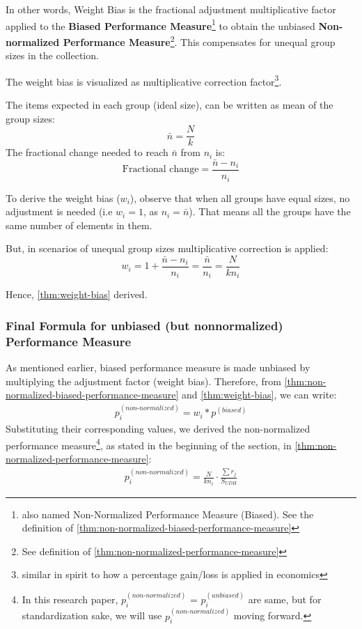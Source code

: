 \documentclass[a4paper,fleqn,review]{cas-sc}
\begin{document}
In other words, Weight Bias is the fractional adjustment multiplicative factor applied to the \textbf{Biased Performance Measure}\footnote{also named Non-Normalized Performance Measure (Biased). See the definition of \autoref{thm:non-normalized-biased-performance-measure}} to obtain the unbiased \textbf{Non-normalized Performance Measure}\footnote{See definition of \autoref{thm:non-normalized-performance-measure}}. This compensates for unequal group sizes in the collection.

\begin{pot}[\ref{thm:weight-bias}]
	 The weight bias is visualized as multiplicative correction factor\footnote{similar in spirit to how a percentage gain/loss is applied in economics}.
\end{pot}

The items expected in each group (ideal size), can be written as mean of the group sizes:
\[
\bar{n} = \frac{N}{k}
\]
The fractional change needed to reach \(\bar{n}\) from \(n_i\) is:
\[
\text{Fractional change} = \frac{\bar{n} - n_i}{n_i}
\]

To derive the weight bias ($w_i$), observe that when all groups have equal sizes, no adjustment is needed (i.e $w_i = 1$, as $n_i = \bar{n}$). That means all the groups have the same number of elements in them. 

But, in scenarios of unequal group sizes multiplicative correction is applied:
\[
w_i = 1 + \frac{\bar{n} - n_i}{n_i} = \frac{\bar{n}}{n_i} = \frac{N}{k n_i}
\]

Hence, \autoref{thm:weight-bias} derived.

\subsubsection{Final Formula for unbiased (but non\text{-}normalized) Performance Measure}

As mentioned earlier, biased performance measure is made unbiased by multiplying the adjustment factor (weight bias). Therefore, from \autoref{thm:non-normalized-biased-performance-measure} and \autoref{thm:weight-bias}, we can write:
\begin{align*}
	p_i^{(non\text{-}normalized)} = w_i * p^{(biased)}
\end{align*}
Substituting their corresponding values, we derived the non-normalized performance measure\footnote{In this research paper, $p_i^{(non\text{-}normalized)}$ = $p_i^{(unbiased)}$ are same, but for standardization sake, we will use $p_i^{(non\text{-}normalized)}$ moving forward.}, as stated in the beginning of the section, in \autoref{thm:non-normalized-performance-measure}:
\begin{align*}
    p_i^{(non\text{-}normalized)} = \frac{N}{k n_i} \cdot \frac{\sum r_j}{ S_{UDH} }
\label{p-non-normalized}
\end{align*}
\end{document}
